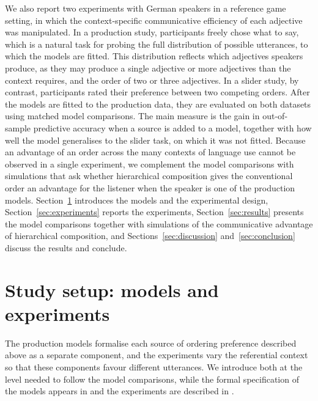 \documentclass[10pt,a4paper,fleqn]{article}
\begin{document}
We also report two experiments with German speakers in a reference game setting, in which the context-specific communicative efficiency of each adjective was manipulated.
In a production study, participants freely chose what to say, which is a natural task for probing the full distribution of possible utterances, to which the models are fitted.
This distribution reflects which adjectives speakers produce, as they may produce a single adjective or more adjectives than the context requires, and the order of two or three adjectives.
In a slider study, by contrast, participants rated their preference between two competing orders.
After the models are fitted to the production data, they are evaluated on both datasets using matched model comparisons.
The main measure is the gain in out-of-sample predictive accuracy when a source is added to a model, together with how well the model generalises to the slider task, on which it was not fitted.
Because an advantage of an order across the many contexts of language use cannot be observed in a single experiment, we complement the model comparisons with simulations that ask whether hierarchical composition gives the conventional order an advantage for the listener when the speaker is one of the production models.
Section~\ref{sec:setup} introduces the models and the experimental design, Section~\ref{sec:experiments} reports the experiments, Section~\ref{sec:results} presents the model comparisons together with simulations of the communicative advantage of hierarchical composition, and Sections~\ref{sec:discussion} and~\ref{sec:conclusion} discuss the results and conclude.

\section{Study setup: models and experiments}
\label{sec:setup}

The production models formalise each source of ordering preference described above as a separate component, and the experiments vary the referential context so that these components favour different utterances.
We introduce both at the level needed to follow the model comparisons, while the formal specification of the models appears in  and the experiments are described in .
\end{document}
